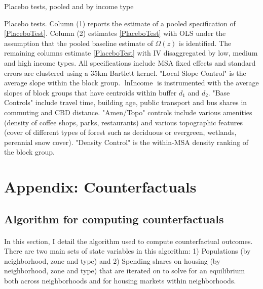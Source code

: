 \documentclass[12pt]{article}
\begin{document}
	\clearpage
	
	\begin{table}
		\caption{Placebo tests, pooled and by income type}\label{table:PlaceboTest}
		\makebox[\textwidth]{}
		\caption*{Placebo tests. Column (1) reports the estimate of a pooled specification of \eqref{PlaceboTest}. Column (2) estimates \eqref{PlaceboTest} with OLS under the assumption that the pooled baseline estimate of $\Omega(z)$ is identified. The remaining columns estimate \eqref{PlaceboTest} with IV disaggregated by low, medium and high income types. All specifications include MSA fixed effects and standard errors are clustered using a 35km Bartlett kernel. "Local Slope Control" is the average slope within the block group. $\ln \text{Income}$ is instrumented with the average slopes of block groups that have centroids within buffer $d_{1}$ and $d_{2}$. "Base Controls" include travel time, building age, public transport and bus shares in commuting and CBD distance. "Amen/Topo" controls include various amenities (density of coffee shops, parks, restaurants) and various topographic features (cover of different types of forest such as deciduous or evergreen, wetlands, perennial snow cover). "Density Control" is the within-MSA density ranking of the block group.}
	\end{table}
	
	
	\clearpage
	
	
	\section{Appendix: Counterfactuals}
	
	\subsection{Algorithm for computing counterfactuals}\label{Appendix:CounterfactualComputation}
	
	\paragraph*{}
	In this section, I detail the algorithm used to compute counterfactual outcomes. There are two main sets of state variables in this algorithm: 1) Populations (by neighborhood, zone and type) and 2) Spending shares on housing (by neighborhood, zone and type) that are iterated on to solve for an equilibrium both across neighborhoods and for housing markets within neighborhoods.
	
\end{document}
